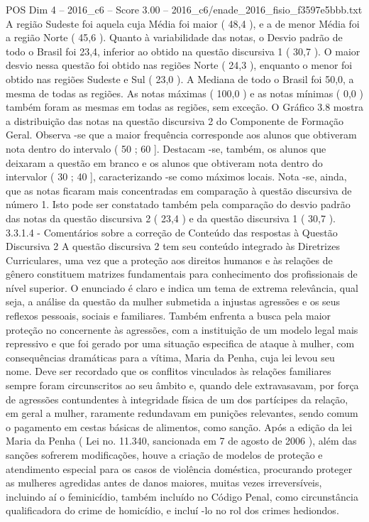 \begin{textsample}{POS Dim 4 – 2016\_c6 – Score 3.00 – 2016\_c6/enade\_2016\_fisio\_f3597e5bbb.txt}
A região Sudeste foi aquela cuja Média foi maior ( 48,4 ), e a de menor Média foi a região Norte ( 45,6 ).
Quanto à variabilidade das notas, o Desvio padrão de todo o Brasil foi 23,4, inferior ao obtido na questão discursiva 1 ( 30,7 ).
O maior desvio nessa questão foi obtido nas regiões Norte ( 24,3 ), enquanto o menor foi obtido nas regiões Sudeste e Sul ( 23,0 ).
A Mediana de todo o Brasil foi 50,0, a mesma de todas as regiões.
As notas máximas ( 100,0 ) e as notas mínimas ( 0,0 ) também foram as mesmas em todas as regiões, sem exceção.
O Gráfico 3.8 mostra a distribuição das notas na questão discursiva 2 do Componente de Formação Geral.
Observa -se que a maior frequência corresponde aos alunos que obtiveram nota dentro do intervalo ( 50 ; 60 ].
Destacam -se, também, os alunos que deixaram a questão em branco e os alunos que obtiveram nota dentro do intervalor ( 30 ; 40 ], caracterizando -se como máximos locais.
Nota -se, ainda, que as notas ficaram mais concentradas em comparação à questão discursiva de número 1.
Isto pode ser constatado também pela comparação do desvio padrão das notas da questão discursiva 2 ( 23,4 ) e da questão discursiva 1 ( 30,7 ). 3.3.1.4 - Comentários sobre a correção de Conteúdo das respostas à Questão Discursiva 2 A questão discursiva 2 tem seu conteúdo integrado às Diretrizes Curriculares, uma vez que a proteção aos direitos humanos e às relações de gênero constituem matrizes fundamentais para conhecimento dos profissionais de nível superior.
O enunciado é claro e indica um tema de extrema relevância, qual seja, a análise da questão da mulher submetida a injustas agressões e os seus reflexos pessoais, sociais e familiares.
Também enfrenta a busca pela maior proteção no concernente às agressões, com a instituição de um modelo legal mais repressivo e que foi gerado por uma situação especifica de ataque à mulher, com consequências dramáticas para a vítima, Maria da Penha, cuja lei levou seu nome.
Deve ser recordado que os conflitos vinculados às relações familiares sempre foram circunscritos ao seu âmbito e, quando dele extravasavam, por força de agressões contundentes à integridade física de um dos partícipes da relação, em geral a mulher, raramente redundavam em punições relevantes, sendo comum o pagamento em cestas básicas de alimentos, como sanção.
Após a edição da lei Maria da Penha ( Lei no. 11.340, sancionada em 7 de agosto de 2006 ), além das sanções sofrerem modificações, houve a criação de modelos de proteção e atendimento especial para os casos de violência doméstica, procurando proteger as mulheres agredidas antes de danos maiores, muitas vezes irreversíveis, incluindo aí o feminicídio, também incluído no Código Penal, como circunstância qualificadora do crime de homicídio, e incluí -lo no rol dos crimes hediondos.

\end{textsample}
